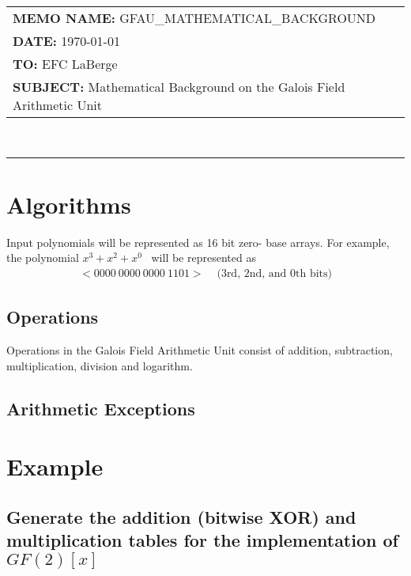 \documentclass[11pt]{extarticle}
\newcommand{\examplepoly}{$x^{3}+x^{2}+x^{0}$}
\newcommand{\documentinfo}[4]{
    \begin{centering}
        \parbox{2in}{
        \begin{spacing}{1}
            \begin{flushleft}
                \begin{tabular}{l l} #1 \\ #2 \\ #3 \\ #4 \\
                \end{tabular} \\
                \rule{\textwidth}{1pt}
            \end{flushleft}
        \end{spacing} }
    \end{centering} }
\begin{document}
    \documentinfo
    {\textbf{MEMO NAME:} GFAU\_MATHEMATICAL\_BACKGROUND}
    {\textbf{DATE:} \today}
    {\textbf{TO:} EFC LaBerge}
    {\textbf{SUBJECT: } Mathematical Background on the Galois Field Arithmetic
    Unit}
    \vspace{-0.1in}

    

    \section{Algorithms} Input polynomials will be represented as 16 bit zero-
    base arrays. For example, the polynomial \examplepoly~ will be represented
    as
        \begin{equation*}
            \begin{split}
                <0000 \ 0000 \ 0000 \ 1101> & \text{  (3rd, 2nd, and 0th bits)}
            \end{split}
        \end{equation*}

        

        
        \subsection{Operations} Operations in the Galois Field Arithmetic Unit
        consist of addition, subtraction, multiplication, division and
        logarithm.

        
        
        
        

        \subsection{Arithmetic Exceptions}

        
        

        
        

    \iffalse
    \section{Example}

        \newpage
        \subsection{Generate the addition (bitwise XOR) and multiplication
        tables for the implementation of $GF(2)[x]$}
\end{document}
